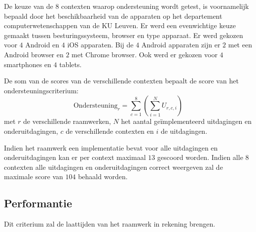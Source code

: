 \begin{table}[H]
 \centering
 \resizebox{14cm}{!} {
 }
 \caption{Beschikbare apparaten met hun besturingssysteem~(BS) en browser.}
 \label{tabel:toestellen-hci}
 \end{table}
 
De keuze van de $8$ contexten waarop ondersteuning wordt getest, is voornamelijk bepaald door het beschikbaarheid van de apparaten op het departement computerwetenschappen van de KU Leuven.
Er werd een evenwichtige keuze gemaakt tussen besturingssysteem,  browser en type apparaat.
Er werd gekozen voor $4$ Android en $4$ iOS apparaten.
Bij de $4$ Android apparaten zijn er $2$ met een Android browser en $2$ met Chrome browser.
Ook werd er gekozen voor $4$ smartphones en $4$ tablets.

De som van de scores van de verschillende contexten bepaalt de score van het ondersteuningscriterium:
\begin{equation}
  \text{Ondersteuning}_r = \sum_{c=1}^{8}{\left(\sum_{i=1}^{N}U_{r,c,i}\right)}
  \label{eq:ondersteuning}
\end{equation}
met $r$ de verschillende raamwerken,  $N$ het aantal geïmplementeerd uitdagingen en onderuitdagingen,  $c$ de verschillende contexten en $i$ de uitdagingen. 


Indien het raamwerk een implementatie bevat voor alle uitdagingen en onderuitdagingen kan er per context maximaal $13$ gescoord worden.
Indien alle $8$ contexten alle uitdagingen en onderuitdagingen correct weergeven zal de maximale score van $104$ behaald worden.


\subsection{Performantie}
\label{sec:vergelijking-performantie}
Dit criterium zal de laattijden van het raamwerk in rekening brengen.

